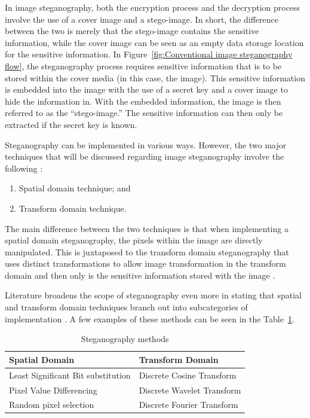 In image steganography, both the encryption process and the decryption process involve the use of a cover image and a stego-image. In short, the difference between the two is merely that the stego-image contains the sensitive information, while the cover image can be seen as an empty data storage location for the sensitive information. In Figure~\ref{fig:Conventional image steganography flow}, the steganography process requires sensitive information that is to be stored within the cover media (in this case, the image). This sensitive information is embedded into the image with the use of a secret key and a cover image to hide the information in. With the embedded information, the image is then referred to as the “stego-image.” The sensitive information can then only be extracted if the secret key is known.

Steganography can be implemented in various ways. However, the two major techniques that will be discussed regarding image steganography involve the following \citep{Pradhan2016, Paul2012}:

\begin{enumerate}[label=\roman*.]
	\item Spatial domain technique; and 
	\item Transform domain technique.
\end{enumerate}

The main difference between the two techniques is that when implementing a spatial domain steganography, the pixels within the image are directly manipulated. This is juxtaposed to the transform domain steganography that uses distinct transformations to allow image transformation in the transform domain and then only is the sensitive information stored with the image \citep{Pradhan2016, Roy2016}.

Literature broadens the scope of steganography even more in stating that spatial and transform domain techniques branch out into subcategories of implementation \citep{Radha2011, SyedAhmad2012, Verma2016}. A few examples of these methods can be seen in the Table~\ref{table: Steganography methods}.

\begin{table}[h]
\caption{Steganography methods}
\centering
 \begin{tabular}{|p{} | p{}|} 
 \hline
	\textbf{Spatial Domain} & \textbf{Transform Domain} \\ [1ex] 
 \hline\hline 
 Least Significant Bit substitution & Discrete Cosine Transform  \\[1ex]
 \hline 
 Pixel Value Differencing & Discrete Wavelet Transform  \\[1ex]
 \hline
 Random pixel selection & Discrete Fourier Transform  \\ [1ex] 
 \hline
 \end{tabular}
 \label{table: Steganography methods}
\end{table}



